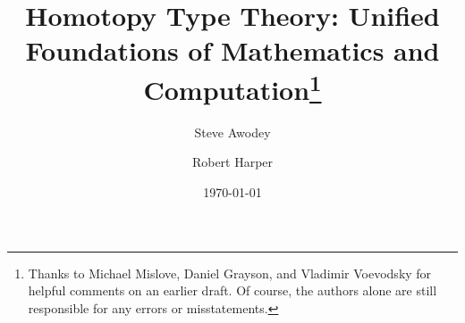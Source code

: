 \documentclass[11pt]{article}
\theoremstyle{remark}
\theoremstyle{definition}
\begin{document}

\title{Homotopy Type Theory:
 Unified Foundations of Mathematics and Computation\thanks{
Thanks to Michael Mislove, Daniel Grayson, and Vladimir Voevodsky for helpful comments on an earlier draft.  Of course, the authors alone are still responsible for any errors or misstatements.}
}
\author{Steve Awodey \and Robert Harper}
\date{\today}
\maketitle


%   
%  
%  
%   
%   
%   
%     
%
\end{document}
